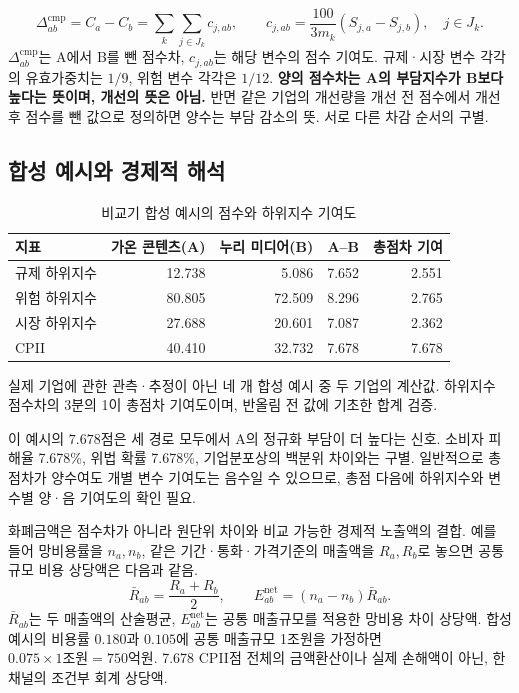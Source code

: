 \[
\Delta^{\mathrm{cmp}}_{ab}=C_a-C_b
=\sum_k\sum_{j\in J_k}c_{j,ab},
\qquad
c_{j,ab}=\frac{100}{3m_k}(S_{j,a}-S_{j,b}),\quad j\in J_k.
\]
\(\Delta^{\mathrm{cmp}}_{ab}\)는 A에서 B를 뺀 점수차, \(c_{j,ab}\)는 해당 변수의 점수 기여도. 규제·시장 변수 각각의 유효가중치는 \(1/9\), 위험 변수 각각은 \(1/12\). \textbf{양의 점수차는 A의 부담지수가 B보다 높다는 뜻이며, 개선의 뜻은 아님.} 반면 같은 기업의 개선량을 개선 전 점수에서 개선 후 점수를 뺀 값으로 정의하면 양수는 부담 감소의 뜻. 서로 다른 차감 순서의 구별.

\subsection*{합성 예시와 경제적 해석}
\begin{table}[H]
\centering
\small
\caption{비교기 합성 예시의 점수와 하위지수 기여도}
\begin{tabular}{lrrrr}
\toprule
지표 & 가온 콘텐츠(A) & 누리 미디어(B) & A--B & 총점차 기여 \\
\midrule
규제 하위지수 & 12.738 & 5.086 & 7.652 & 2.551 \\
위험 하위지수 & 80.805 & 72.509 & 8.296 & 2.765 \\
시장 하위지수 & 27.688 & 20.601 & 7.087 & 2.362 \\
CPII & 40.410 & 32.732 & 7.678 & 7.678 \\
\bottomrule
\end{tabular}
\par\smallskip
\begin{minipage}{0.96\linewidth}\footnotesize
실제 기업에 관한 관측·추정이 아닌 네 개 합성 예시 중 두 기업의 계산값. 하위지수 점수차의 3분의 1이 총점차 기여도이며, 반올림 전 값에 기초한 합계 검증.
\end{minipage}
\end{table}

이 예시의 \(7.678\)점은 세 경로 모두에서 A의 정규화 부담이 더 높다는 신호. 소비자 피해율 7.678\%, 위법 확률 7.678\%, 기업분포상의 백분위 차이와는 구별. 일반적으로 총점차가 양수여도 개별 변수 기여도는 음수일 수 있으므로, 총점 다음에 하위지수와 변수별 양·음 기여도의 확인 필요.

화폐금액은 점수차가 아니라 원단위 차이와 비교 가능한 경제적 노출액의 결합. 예를 들어 망비용률을 \(n_a,n_b\), 같은 기간·통화·가격기준의 매출액을 \(R_a,R_b\)로 놓으면 공통규모 비용 상당액은 다음과 같음.
\[
\bar R_{ab}=\frac{R_a+R_b}{2},\qquad
E^{\mathrm{net}}_{ab}=(n_a-n_b)\bar R_{ab}.
\]
\(\bar R_{ab}\)는 두 매출액의 산술평균, \(E^{\mathrm{net}}_{ab}\)는 공통 매출규모를 적용한 망비용 차이 상당액. 합성 예시의 비용률 \(0.180\)과 \(0.105\)에 공통 매출규모 1조원을 가정하면 \(0.075\times1\text{조원}=750\text{억원}\). 7.678 CPII점 전체의 금액환산이나 실제 손해액이 아닌, 한 채널의 조건부 회계 상당액.

